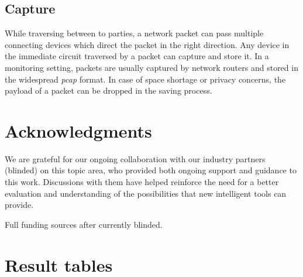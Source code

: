 \documentclass[sigconf,anonymous]{acmart}\usepackage[]{graphicx}\usepackage[]{color}
\begin{document}
\subsection{Capture}

While traversing between to parties, a network packet can pass multiple connecting devices which direct the packet in the right direction. Any device in the immediate circuit traversed by a packet can capture and store it. In a monitoring setting, packets are usually captured by network routers and stored in the widespread \textit{pcap} format. In case of space shortage or privacy concerns, the payload of a packet can be dropped in the saving process.


\section{Acknowledgments}

We are grateful for our ongoing collaboration with our industry partners (blinded) on this topic area, who provided both ongoing support and guidance to this work. Discussions with them have helped reinforce the need for a better evaluation and understanding of the possibilities that new intelligent tools can provide.

Full funding sources after currently blinded.


  


\appendix

\section{Result tables}





 
\end{document}
